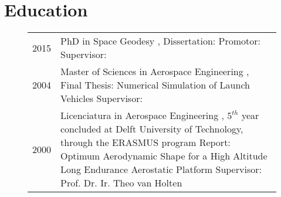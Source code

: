 \documentclass[a4paper]{article}
\newcommand{\dynhref}[2]{%
  \iftoggle{expliciturl}{%
    #2 (\href{#1}{\texttt{\detokenize{#1}}})%
  }{%
    \href{#1}{#2}%
  }%
}
\newlength{\listskipbig}
\newenvironment{cvsection}[2]{
  \setlength{\floatsep}{0pt}
  \setlength{\textfloatsep}{0pt}
  \setlength{\intextsep}{0pt}
  \section*{#1}
  \begin{figure}[H]
  \begin{longtable}{lp{#2}}
}{
  \end{longtable}
  \end{figure}
}
\begin{document}

\begin{cvsection}{Education}{13.5cm}

2015 & PhD in Space Geodesy\newline
      \dynhref{http://tinyurl.com/GRS-TUDelft}{Geoscience \& Remote Sensing}, \dynhref{http://www.tudelft.nl/}{Delft University of Technology}\newline
      Dissertation: \dynhref{http://tinyurl.com/SatGrav}{Next-generation satellite gravimetry for measuring mass transport in the Earth system}\newline
      Promotor: \dynhref{http://tinyurl.com/ProfKlees}{Prof. Dr.-Ing. habil. Roland Klees}\newline
      Supervisor: \dynhref{http://tinyurl.com/DrDitmar}{dr.ir. Pavel Ditmar}\\[\listskipbig]

2004 & Master of Sciences in Aerospace Engineering\newline
      \dynhref{http://www.as.lr.tudelft.nl}{Astrodynamics and Space Missions}, \dynhref{http://www.tudelft.nl/}{Delft University of Technology}\newline
      Final Thesis: Numerical Simulation of Launch Vehicles\newline
      Supervisor: \dynhref{http://tinyurl.com/ProfAmbrosius}{Prof.ir. B.A.C. Ambrosius}\\[\listskipbig]

2000 & Licenciatura in Aerospace Engineering\newline
       \dynhref{http://www.ist.utl.pt/}{Instituto Superior T{\'e}cnico}, \dynhref{http://www.utl.pt/}{Technical University of Lisbon}\newline
       $5^{th}$ year concluded at Delft University of Technology, through the ERASMUS program\newline
       Report: Optimum Aerodynamic Shape for a High Altitude Long Endurance Aerostatic Platform\newline
       Supervisor: Prof. Dr. Ir. Theo van Holten\\[\listskipbig]

\end{cvsection}



\end{document}
